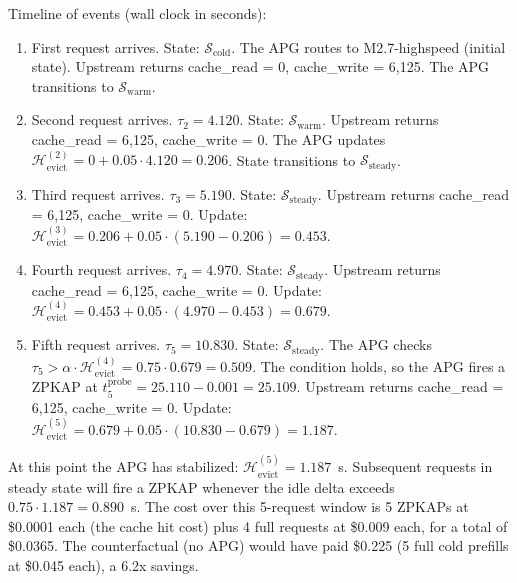 \noindent
Timeline of events (wall clock in seconds):
\begin{enumerate}
  \item[$t_1 = 0.000$] First request arrives. State:
        $\mathcal{S}_{\text{cold}}$. The APG routes to
        M2.7-highspeed (initial state). Upstream returns
        cache\_read = 0, cache\_write = 6{,}125. The APG
        transitions to $\mathcal{S}_{\text{warm}}$.
  \item[$t_2 = 4.120$] Second request arrives.
        $\tau_2 = 4.120$. State: $\mathcal{S}_{\text{warm}}$.
        Upstream returns cache\_read = 6{,}125, cache\_write = 0.
        The APG updates $\mathcal{H}_{\text{evict}}^{(2)} = 0
        + 0.05 \cdot 4.120 = 0.206$. State transitions to
        $\mathcal{S}_{\text{steady}}$.
  \item[$t_3 = 9.310$] Third request arrives.
        $\tau_3 = 5.190$. State: $\mathcal{S}_{\text{steady}}$.
        Upstream returns cache\_read = 6{,}125, cache\_write = 0.
        Update: $\mathcal{H}_{\text{evict}}^{(3)} = 0.206
        + 0.05 \cdot (5.190 - 0.206) = 0.453$.
  \item[$t_4 = 14.280$] Fourth request arrives.
        $\tau_4 = 4.970$. State: $\mathcal{S}_{\text{steady}}$.
        Upstream returns cache\_read = 6{,}125, cache\_write = 0.
        Update: $\mathcal{H}_{\text{evict}}^{(4)} = 0.453
        + 0.05 \cdot (4.970 - 0.453) = 0.679$.
  \item[$t_5 = 25.110$] Fifth request arrives.
        $\tau_5 = 10.830$. State: $\mathcal{S}_{\text{steady}}$.
        The APG checks $\tau_5 > \alpha \cdot
        \mathcal{H}_{\text{evict}}^{(4)} = 0.75 \cdot 0.679
        = 0.509$. The condition holds, so the APG fires a
        ZPKAP at $t_5^{\text{probe}} = 25.110 - 0.001 = 25.109$.
        Upstream returns cache\_read = 6{,}125, cache\_write = 0.
        Update: $\mathcal{H}_{\text{evict}}^{(5)} = 0.679
        + 0.05 \cdot (10.830 - 0.679) = 1.187$.
\end{enumerate}

\noindent
At this point the APG has stabilized:
$\mathcal{H}_{\text{evict}}^{(5)} = 1.187$~s. Subsequent
requests in steady state will fire a ZPKAP whenever the idle
delta exceeds $0.75 \cdot 1.187 = 0.890$~s. The cost over
this 5-request window is 5 ZPKAPs at \$0.0001 each (the cache
hit cost) plus 4 full requests at \$0.009 each, for a total of
\$0.0365. The counterfactual (no APG) would have paid \$0.225
(5 full cold prefills at \$0.045 each), a 6.2x savings.

